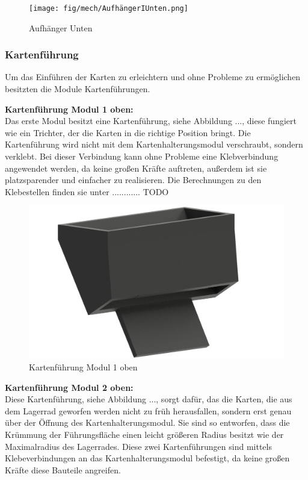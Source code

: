 \begin{figure}
    \centering
    \texttt{[image: fig/mech/AufhängerIUnten.png]}
    \caption{Aufhänger Unten}
\end{figure}

\subsubsection{Kartenführung}
Um das Einführen der Karten zu erleichtern und ohne Probleme zu ermöglichen besitzten die Module Kartenführungen.

\textbf{Kartenführung Modul 1 oben:} \\
Das erste Modul besitzt eine Kartenführung, siehe Abbildung ..., diese fungiert wie ein Trichter, der die Karten in die richtige Position bringt.
Die Kartenführung wird nicht mit dem Kartenhalterungsmodul verschraubt, sondern
verklebt. Bei dieser Verbindung kann ohne Probleme eine Klebverbindung angewendet werden, da keine großen Kräfte auftreten, außerdem
ist sie platzsparender und einfacher zu realisieren. Die Berechnungen zu den Klebestellen finden sie unter ............ TODO

\begin{figure}
    \centering
    \includegraphics[scale=0.5,page=1]{fig/mech/KarteneinlaufNeu.png}
    \caption{Kartenführung Modul 1 oben}
\end{figure}

\textbf{Kartenführung Modul 2 oben:} \\
Diese Kartenführung, siehe Abbildung ..., sorgt dafür, das die Karten, die aus dem Lagerrad geworfen werden nicht zu früh herausfallen,
sondern erst genau über der Öffnung des Kartenhalterungsmodul. Sie sind so entworfen, dass die Krümmung der Führungsfläche einen leicht
größeren Radius besitzt wie der Maximalradius des Lagerrades. Diese zwei Kartenführungen sind mittels Klebeverbindungen
an das Kartenhalterungsmodul befestigt, da keine großen Kräfte diese Bauteile angreifen.

